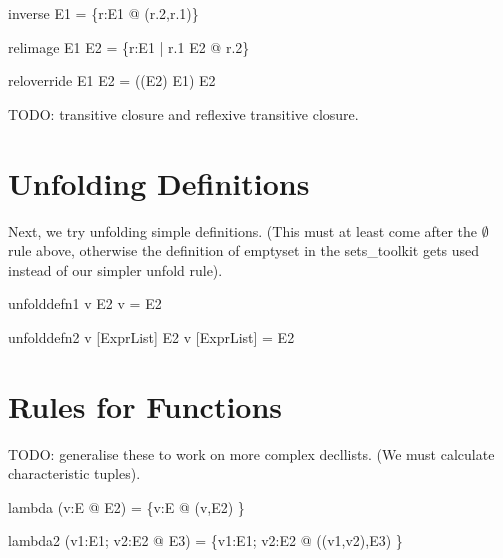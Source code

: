 \documentclass{article}
\begin{document}
\begin{zedrule}{inverse}
   E1 \inv = \{r:E1 @ (r.2,r.1)\}
\end{zedrule}

\begin{zedrule}{relimage}
   E1 \limg E2 \rimg = \{r:E1 | r.1 \in E2 @ r.2\}
\end{zedrule}

\begin{zedrule}{reloverride}
   E1 \oplus E2 = ((\dom E2) \ndres E1) \cup E2
\end{zedrule}

TODO: transitive closure and reflexive transitive closure.


\section{Unfolding Definitions}

Next, we try unfolding simple definitions.
(This must at least come after the $\emptyset$ rule above,
otherwise the definition of emptyset in the sets\_toolkit
gets used instead of our simpler unfold rule).

\begin{zedrule}{unfolddefn1}
  v \hasDefn E2
\derives
   v = E2
\end{zedrule}

\begin{zedrule}{unfolddefn2}
  v [ExprList] \hasDefn E2
\derives
   v [ExprList] = E2
\end{zedrule}


\section{Rules for Functions}

TODO: generalise these to work on more complex decllists.
(We must calculate characteristic tuples).
\begin{zedrule}{lambda}
   (\lambda v:E @ E2) = \{v:E @ (v,E2) \}
\end{zedrule}
\begin{zedrule}{lambda2}
   (\lambda v1:E1; v2:E2 @ E3) = \{v1:E1; v2:E2 @ ((v1,v2),E3) \}
\end{zedrule}

\end{document}
